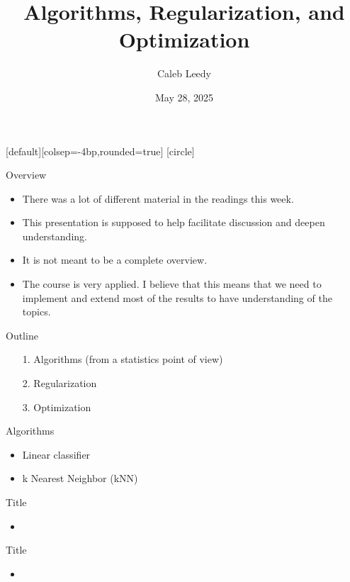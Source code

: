 \documentclass{beamer} %
\author{Caleb Leedy}
\title[AI NRI]{Algorithms, Regularization, and Optimization}
\date{May 28, 2025}
\begin{document}
\everymath{\displaystyle}
[default][colsep=-4bp,rounded=true]
[circle]
\frame{\titlepage}

\begin{frame}{Overview}

  \begin{itemize}
    \item There was a lot of different material in the readings this week.
    \item This presentation is supposed to help facilitate discussion and deepen understanding.
    \item It is not meant to be a complete overview.
    \item The course is very applied. I believe that this means that we need to
      implement and extend most of the results to have understanding of the
      topics.
  \end{itemize}

\end{frame}

\begin{frame}{Outline}
  \begin{itemize}
    \item[1.] Algorithms (from a statistics point of view)
    \item[2.] Regularization
    \item[3.] Optimization
  \end{itemize}
\end{frame}

\begin{frame}{Algorithms}
  \begin{itemize}
    \item Linear classifier
    \item k Nearest Neighbor (kNN)
  \end{itemize}
\end{frame}


\begin{frame}{Title}
  \begin{itemize}
    \item
  \end{itemize}
\end{frame}

\begin{frame}{Title}
  \begin{itemize}
    \item
  \end{itemize}
\end{frame}
\end{document}
